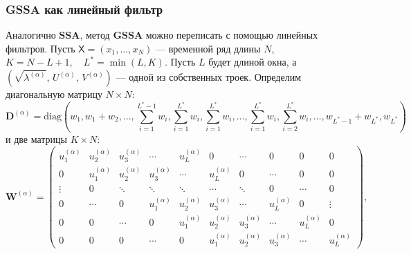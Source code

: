 \documentclass[a4paper, 11pt]{article}
\newcommand{\SSA}{\textbf{SSA}}
\newcommand{\GSSA}{\textbf{GSSA}}
\newcommand{\TS}{\mathsf{X}}
\begin{document}
\subsubsection{GSSA как линейный фильтр}
Аналогично $\SSA$, метод $\GSSA$ можно переписать с помощью линейных фильтров.
Пусть $\TS = (x_1, \dots, x_{N})$ --- временной ряд длины $N$, $K = N - L + 1, \quad L^{*} = \min(L, K)$. Пусть $L$ будет длиной окна, а $(\sqrt{\lambda^{(\alpha)}},\,U^{(\alpha)},\,V^{(\alpha)})$ — одной из собственных троек. Определим диагональную матрицу $N \times N$:
$$
	\mathbf{D}^{(\alpha)} = \text{diag}(w_1, w_1 + w_2, \ldots,
	\sum \limits_{i = 1}^{L^*-1}w_i,
	\sum \limits_{i = 1}^{L^*}w_i, \sum \limits_{i = 1}^{L^*}w_i, \ldots, \sum \limits_{i = 1}^{L^*}w_i,
	\sum \limits_{i = 2}^{L^*}w_i, \ldots, w_{L^*-1}+ w_{L^*}, w_{L^*})
$$
и две матрицы  $K \times N$:
\[
	\mathbf{W}^{(\alpha)} = \begin{pmatrix}
		u_{1}^{(\alpha)} & u_{2}^{(\alpha)} & u_{3}^{(\alpha)} & \cdots           & u_{L}^{(\alpha)} & 0                & \cdots           & 0                & 0                & 0                \\
		0                & u_{1}^{(\alpha)} & u_{2}^{(\alpha)} & u_{3}^{(\alpha)} & \cdots           & u_{L}^{(\alpha)} & 0                & \cdots           & 0                & 0                \\
		\vdots           & 0                & \ddots           & \ddots           & \ddots           & \cdots           & \ddots           & 0                & \cdots           & 0                \\
		0                & \cdots           & 0                & u_{1}^{(\alpha)} & u_{2}^{(\alpha)} & u_{3}^{(\alpha)} & \cdots           & u_{L}^{(\alpha)} & 0                & \vdots           \\
		0                & 0                & \cdots           & 0                & u_{1}^{(\alpha)} & u_{2}^{(\alpha)} & u_{3}^{(\alpha)} & \cdots           & u_{L}^{(\alpha)} & 0                \\
		0                & 0                & 0                & \cdots           & 0                & u_{1}^{(\alpha)} & u_{2}^{(\alpha)} & u_{3}^{(\alpha)} & \cdots           & u_{L}^{(\alpha)}
	\end{pmatrix},
\]
\end{document}
